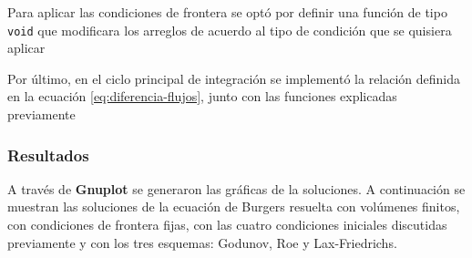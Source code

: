 \documentclass[12pt]{article}
\begin{document}
 	
 	
 	Para aplicar las condiciones de frontera se optó por definir una función de tipo \texttt{void} que modificara los arreglos de acuerdo al tipo de condición que se quisiera aplicar
 	
 	
 	
 	Por último, en el ciclo principal de integración se implementó la relación definida en la ecuación \ref{eq:diferencia-flujos}, junto con las funciones explicadas previamente
 	
 	
 	\subsubsection{Resultados}
 	A través de \textbf{Gnuplot} se generaron las gráficas de la soluciones. A continuación se muestran las soluciones de la ecuación de Burgers resuelta con volúmenes finitos, con condiciones de frontera fijas, con las cuatro condiciones iniciales discutidas previamente y con los tres esquemas: Godunov, Roe y Lax-Friedrichs.
 	
\end{document}
